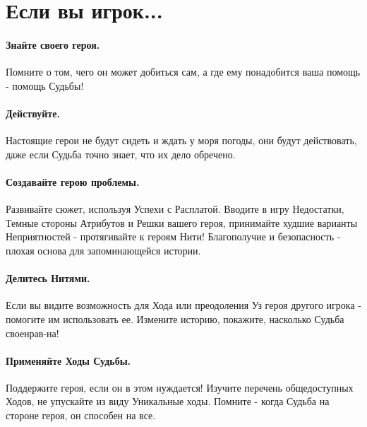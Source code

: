 \section*{Если вы игрок...}

\paragraph{Знайте своего героя.} Помните о том, чего он может добиться сам, а где ему понадобится ваша помощь - помощь Судьбы!
\paragraph{Действуйте.} Настоящие герои не будут сидеть и ждать у моря погоды, они будут действовать, даже если Судьба точно знает, что их дело обречено.
\paragraph{Создавайте герою проблемы.} Развивайте сюжет, используя Успехи с Расплатой. Вводите в игру Недостатки, Темные стороны Атрибутов и Решки вашего героя, принимайте худшие варианты Неприятностей - протягивайте к героям Нити! Благополучие и безопасность - плохая основа для запоминающейся истории.
\paragraph{Делитесь Нитями.} Если вы видите возможность для Хода или преодоления Уз героя другого игрока - помогите им использовать ее. Измените историю, покажите, насколько Судьба своенрав-на!
\paragraph{Применяйте Ходы Судьбы.} Поддержите героя, если он в этом нуждается! Изучите перечень общедоступных Ходов, не упускайте из виду Уникальные ходы. Помните - когда Судьба на стороне героя, он способен на все.
